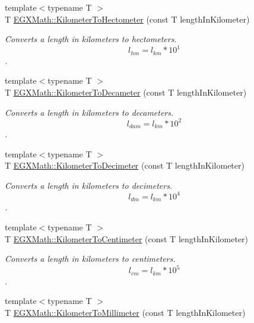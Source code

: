 \begin{DoxyCompactItemize}
{\footnotesize template$<$typename T $>$ }\\T \mbox{\hyperlink{group___e_g_x_math-_conversions-_length_conversions-_kilometer-_s_i_ga43aeeda4346af2ec10e749d076d38bc3}{E\+G\+X\+Math\+::\+Kilometer\+To\+Hectometer}} (const T length\+In\+Kilometer)
\begin{DoxyCompactList}\small\item\em Converts a length in kilometers to hectometers. \[ l_{hm}=l_{km} * 10^{1} \]. \end{DoxyCompactList}\item 
{\footnotesize template$<$typename T $>$ }\\T \mbox{\hyperlink{group___e_g_x_math-_conversions-_length_conversions-_kilometer-_s_i_ga040acc3477237c471c0336e5b44d4654}{E\+G\+X\+Math\+::\+Kilometer\+To\+Decameter}} (const T length\+In\+Kilometer)
\begin{DoxyCompactList}\small\item\em Converts a length in kilometers to decameters. \[ l_{dam}=l_{km} * 10^{2} \]. \end{DoxyCompactList}\item 
{\footnotesize template$<$typename T $>$ }\\T \mbox{\hyperlink{group___e_g_x_math-_conversions-_length_conversions-_kilometer-_s_i_ga6b9e471fb53794741dcf3859d316b1c1}{E\+G\+X\+Math\+::\+Kilometer\+To\+Decimeter}} (const T length\+In\+Kilometer)
\begin{DoxyCompactList}\small\item\em Converts a length in kilometers to decimeters. \[ l_{dm}=l_{km} * 10^{4} \]. \end{DoxyCompactList}\item 
{\footnotesize template$<$typename T $>$ }\\T \mbox{\hyperlink{group___e_g_x_math-_conversions-_length_conversions-_kilometer-_s_i_ga1d5cac5eab11ffbf7b839180813343d0}{E\+G\+X\+Math\+::\+Kilometer\+To\+Centimeter}} (const T length\+In\+Kilometer)
\begin{DoxyCompactList}\small\item\em Converts a length in kilometers to centimeters. \[ l_{cm}=l_{km} * 10^{5} \]. \end{DoxyCompactList}\item 
{\footnotesize template$<$typename T $>$ }\\T \mbox{\hyperlink{group___e_g_x_math-_conversions-_length_conversions-_kilometer-_s_i_ga109bb9ca348173d3bfd643a4e3bd3686}{E\+G\+X\+Math\+::\+Kilometer\+To\+Millimeter}} (const T length\+In\+Kilometer)

\end{DoxyCompactItemize}
